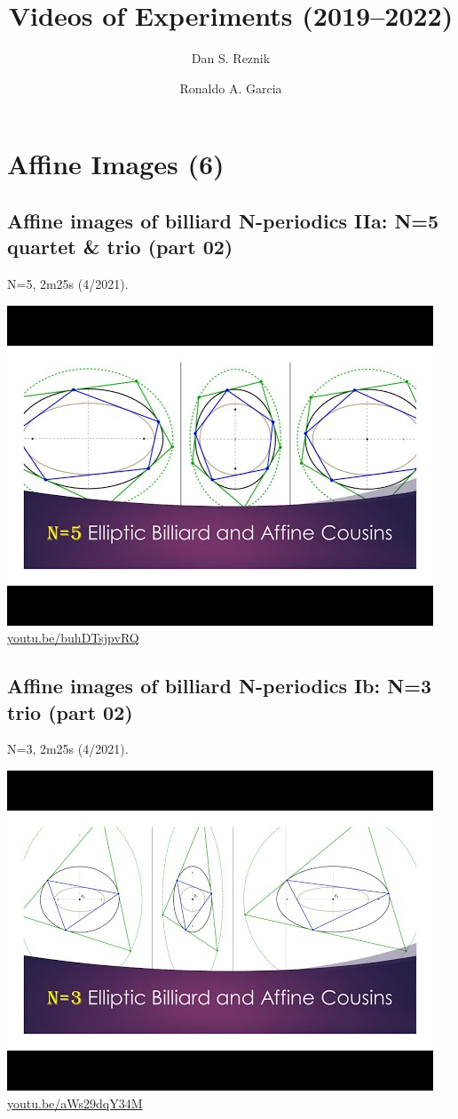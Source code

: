\documentclass[12pt]{amsart}
\title{Videos of Experiments (2019--2022)}
\author{Dan S. Reznik}
\author{Ronaldo A. Garcia}
\begin{document}
\maketitle

\tableofcontents
\section{Affine Images (6)}

\subsection{Affine images of billiard N-periodics IIa: N=5 quartet \& trio (part 02)}
\label{vid:buhDTsjpvRQ}
\noindent N=5, 2m25s (4/2021). 
\begin{center}\includegraphics[width=.5\textwidth]{pics/buhDTsjpvRQ.jpg} \\ 
\href{https://youtu.be/buhDTsjpvRQ}{\url{youtu.be/buhDTsjpvRQ}}\end{center}
% 
\subsection{Affine images of billiard N-periodics Ib: N=3 trio (part 02)}
\label{vid:aWs29dqY34M}
\noindent N=3, 2m25s (4/2021). 
\begin{center}\includegraphics[width=.5\textwidth]{pics/aWs29dqY34M.jpg} \\ 
\href{https://youtu.be/aWs29dqY34M}{\url{youtu.be/aWs29dqY34M}}\end{center}
% 
\end{document}
